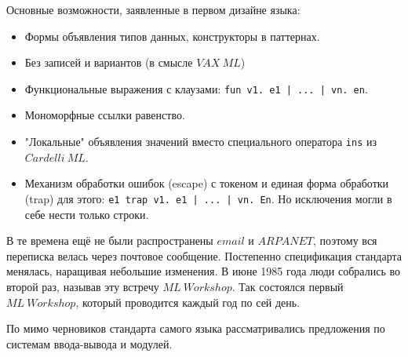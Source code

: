 \documentclass[14pt]{matmex-diploma-custom}
\begin{document}
Основные возможности, заявленные в первом дизайне языка:
\begin{itemize}
\item Формы объявления типов данных, конструкторы в паттернах.
\item Без записей и вариантов (в смысле $V\!AX\ M\!L$)
\item Функциональные выражения с клаузами: \verb=fun v1. e1 | ... | vn. en=.
\item Мономорфные ссылки равенство.
\item "Локальные" объявления значений вместо специального оператора \verb=ins= из $Cardelli\ M\!L$.
\item Механизм обработки ошибок (escape) с токеном и единая форма обработки (trap) для этого: \verb=e1 trap v1. e1 | ... | vn. En=. Но исключения могли в себе нести только строки.
\end{itemize}
%


В те времена ещё не были распространены $email$ и $ARPANET$, поэтому вся переписка велась через почтовое сообщение. Постепенно спецификация стандарта менялась, наращивая небольшие изменения. В июне 1985 года люди собрались во второй раз, называв эту встречу $ML\ Workshop$. Так состоялся первый $ML\ Workshop$, который проводится каждый год по сей день.

По мимо черновиков стандарта самого языка рассматривались предложения по системам ввода-вывода и модулей.

\end{document}
